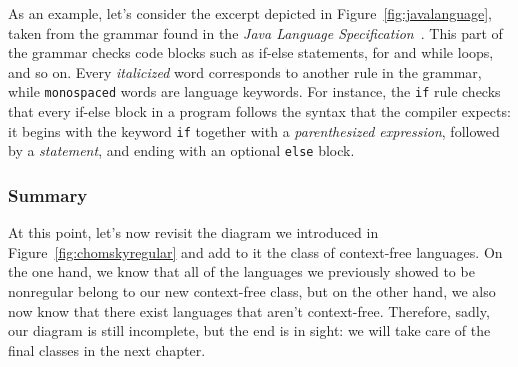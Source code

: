 As an example, let's consider the excerpt depicted in Figure~\ref{fig:javalanguage}, taken from the grammar found in the \textit{Java Language Specification}~\citep*[chapter 18]{Gosling2005JavaLanguageSpecification}. This part of the grammar checks code blocks such as if-else statements, for and while loops, and so on. Every \textit{italicized} word corresponds to another rule in the grammar, while \texttt{monospaced} words are language keywords. For instance, the \texttt{if} rule checks that every if-else block in a program follows the syntax that the compiler expects: it begins with the keyword \texttt{if} together with a \textit{parenthesized expression}, followed by a \textit{statement}, and ending with an optional \texttt{else} block.






%

\subsubsection*{Summary}

At this point, let's now revisit the diagram we introduced in Figure~\ref{fig:chomskyregular} and add to it the class of context-free languages. On the one hand, we know that all of the languages we previously showed to be nonregular belong to our new context-free class, but on the other hand, we also now know that there exist languages that aren't context-free. Therefore, sadly, our diagram is still incomplete, but the end is in sight: we will take care of the final classes in the next chapter.

